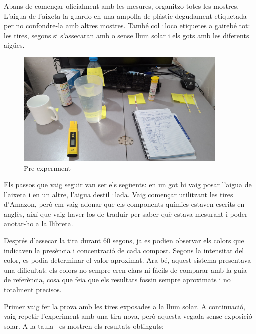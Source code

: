 Abans de començar oficialment amb les mesures, organitzo totes les mostres. L’aigua de l’aixeta la guardo en una ampolla de plàstic degudament etiquetada per no confondre-la amb altres mostres. També col·loco etiquetes a gairebé tot: les tires, segons si s’assecaran amb o sense llum solar i els gots amb les diferents aigües.

\begin{figure}[h]
\centering
\includegraphics[width=0.9\textwidth, angle=0]{./Figures/expe.png}
\caption{Pre-experiment }
\label{fig:fotoPreExperiment}
\end{figure}

Els passos que vaig seguir van ser els següents: en un got hi vaig posar l’aigua de l’aixeta i en un altre, l’aigua destil·lada. Vaig començar utilitzant les tires d’Amazon, però em vaig adonar que els components químics estaven escrits en anglès, així que vaig haver-los de traduir per saber què estava mesurant i poder anotar-ho a la llibreta.

Després d’assecar la tira durant 60 segons, ja es podien observar els colors que indicaven la presència i concentració de cada compost. Segons la intensitat del color, es podia determinar el valor aproximat. Ara bé, aquest sistema presentava una dificultat: els colors no sempre eren clars ni fàcils de comparar amb la guia de referència, cosa que feia que els resultats fossin sempre aproximats i no totalment precisos.

Primer vaig fer la prova amb les tires exposades a la llum solar. A continuació, vaig repetir l’experiment amb una tira nova, però aquesta vegada sense exposició solar. A la taula~\cite{tab:comparacio_dades} es mostren els resultats obtinguts:

